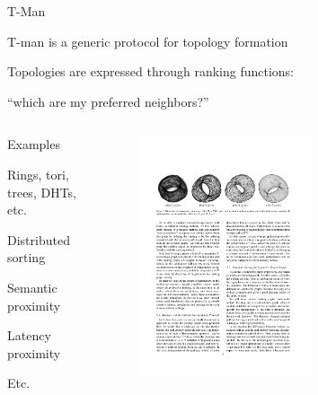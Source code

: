 \begin{frame}{T-Man}
	
\BIL
\item T-man is a generic protocol for topology formation
\item Topologies are expressed through ranking functions:
	\BI
	\item “which are my preferred neighbors?”
	\EI
\EIL

\begin{columns}
\begin{column}{0.5\textwidth}
\BIL	
\item Examples
\BI
\item Rings, tori, trees, DHTs, etc.
\item Distributed sorting
\item Semantic proximity
\item Latency proximity 
\item Etc.	
\EI
\EIL
\end{column}	
\begin{column}{0.5\textwidth}
	\begin{figure}
	\includegraphics[width=0.6\textwidth]{figs/11/torus}
	\end{figure}
\end{column}	
\end{columns}	
\end{frame}

